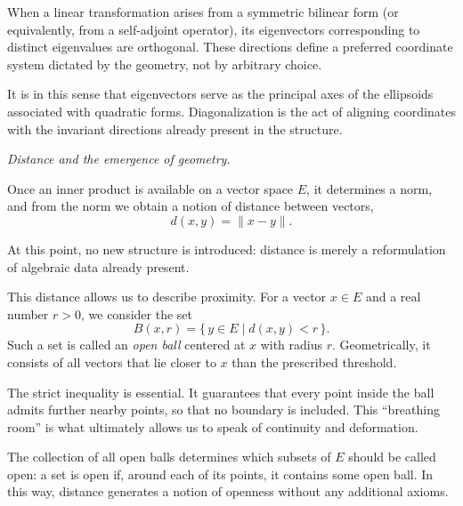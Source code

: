 \medskip

When a linear transformation arises from a symmetric bilinear form (or
equivalently, from a self-adjoint operator), its eigenvectors corresponding
to distinct eigenvalues are orthogonal.
These directions define a preferred coordinate system dictated by the geometry,
not by arbitrary choice.

\medskip

It is in this sense that eigenvectors serve as the principal axes of the
ellipsoids associated with quadratic forms.
Diagonalization is the act of aligning coordinates with the invariant directions
already present in the structure.

\medskip


\textit{Distance and the emergence of geometry.}

Once an inner product is available on a vector space $E$, it determines a norm,
and from the norm we obtain a notion of distance between vectors,
\[
d(x,y)=\|x-y\|.
\]

At this point, no new structure is introduced: distance is merely a
reformulation of algebraic data already present.

\medskip

This distance allows us to describe proximity. For a vector $x \in E$ and a
real number $r > 0$, we consider the set
\[
B(x,r) = \{\, y \in E \mid d(x,y) < r \,\}.
\]
Such a set is called an \textit{open ball} centered at $x$ with radius $r$.
Geometrically, it consists of all vectors that lie closer to $x$ than the
prescribed threshold.

\medskip

The strict inequality is essential. It guarantees that every point inside the
ball admits further nearby points, so that no boundary is included.
This ``breathing room'' is what ultimately allows us to speak of continuity and
deformation.

\medskip

The collection of all open balls determines which subsets of $E$ should be
called open: a set is open if, around each of its points, it contains some open
ball.
In this way, distance generates a notion of openness without any additional
axioms.


